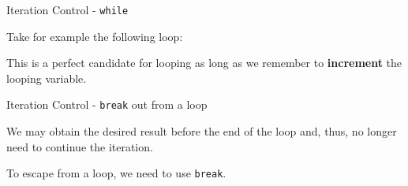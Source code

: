 \begin{frame}[fragile]{Iteration Control - \texttt{while}}

Take for example the following loop:

\begin{Shaded}
\begin{Highlighting}[]
\StringTok{ }
\StringTok{ }\NormalTok{) \{}
  \NormalTok{)}
  \StringTok{ }\StringTok{ }    
\NormalTok{\}}
\end{Highlighting}
\end{Shaded}

This is a perfect candidate for looping as long as we remember to
\textbf{increment} the looping variable.

\end{frame}

\begin{frame}[fragile]{Iteration Control - \texttt{break} out from a
loop}

We may obtain the desired result before the end of the loop and, thus,
no longer need to continue the iteration.

To escape from a loop, we need to use \texttt{break}.

\begin{Shaded}
\begin{Highlighting}[]
\StringTok{ }
\StringTok{ }\NormalTok{) \{}
  \StringTok{ }\NormalTok{)\{  }
  \NormalTok{\}}
  \NormalTok{)}
  \StringTok{ }\StringTok{ }    
\NormalTok{\}}
\end{Highlighting}
\end{Shaded}

\end{frame}


